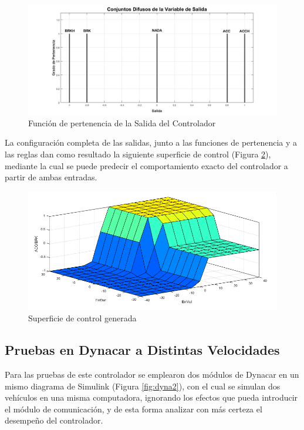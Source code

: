 \begin{figure}[!h]
	\centering
		\includegraphics[scale=0.30]{Imagenes/fuzzyacc}
		\caption{Función de pertenencia de la Salida del Controlador}
		\label{fig:fuzzyacc}
\end{figure}	 

\par La configuración completa de las salidas, junto a las funciones de pertenencia y a las reglas dan como resultado la siguiente superficie de control (Figura \ref{fig:supacc}), mediante la cual se puede predecir el comportamiento exacto del controlador a partir de ambas entradas.\\

\begin{figure}[!h]
	\centering
		\includegraphics[scale=0.4]{Imagenes/supacc}
		\caption{Superficie de control generada}
		\label{fig:supacc}
\end{figure}	 

\subsection{Pruebas en Dynacar a Distintas Velocidades}

Para las pruebas de este controlador se emplearon dos módulos de Dynacar en un mismo diagrama de Simulink (Figura \ref{fig:dyna2}), con el cual se simulan dos vehículos en una misma computadora, ignorando los efectos que pueda introducir el módulo de comunicación, y de esta forma analizar con más certeza el desempeño del controlador. 

